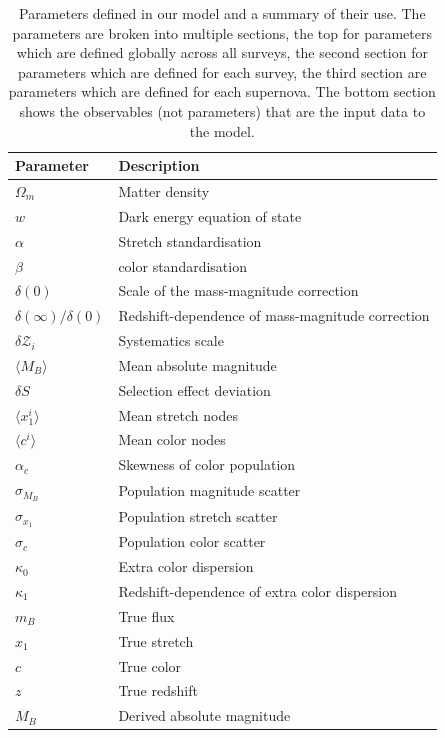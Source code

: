 \documentclass[a4paper,fleqn,usenatbib]{emulateapj}
\begin{document}
\begin{table}
	\centering
	\caption{ Parameters defined in our model and a summary of their use. The parameters are broken into multiple sections, the top for parameters which are defined globally across all surveys, the second section for parameters which are defined for each survey, the third section are parameters which are defined for each supernova. The bottom section shows the observables (not parameters) that are the input data to the model.}
	\label{tab:param_summary}
	\begin{tabular}{ll}
		\hline
		Parameter & Description \\
		\hline
		$\Omega_m$  & Matter density  \\
		$w$  &  Dark energy equation of state  \\
		$\alpha$ & Stretch standardisation   \\
		$\beta$         &  color standardisation   \\
		$\delta(0)$ & Scale of the mass-magnitude correction\\
		$\delta(\infty)/\delta(0)$ & Redshift-dependence of mass-magnitude correction\\
		$\delta\mathcal{Z}_i$ & Systematics scale\\
		$\langle M_B \rangle$ & Mean absolute magnitude \\
		\hline
		$\delta S$ & Selection effect deviation \\
		$\langle x_1^i \rangle$ & Mean stretch nodes\\
		$\langle c^i \rangle$ & Mean color nodes\\
		$\alpha_c$ & Skewness of color population \\
		$\sigma_{M_B}$ & Population magnitude scatter \\
		$\sigma_{x_1}$ & Population stretch scatter \\
		$\sigma_{c}$ & Population color scatter \\
		$\kappa_{0}$ & Extra color dispersion\\
		$\kappa_{1}$ & Redshift-dependence of extra color dispersion\\
		\hline
		$m_B$ & True flux\\
		$x_1$ & True stretch \\
		$c$ & True color \\
		$z$ & True redshift \\
		$M_B$ & Derived absolute magnitude \\

\end{tabular}
\end{table}
\end{document}
